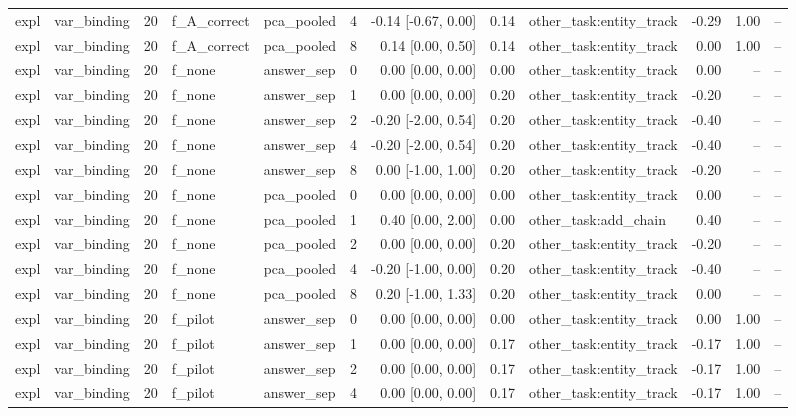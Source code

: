 \begin{tabular}{llrllrrrlrrr}
expl & var\_binding & 20 & f\_A\_correct & pca\_pooled & 4 & -0.14 [-0.67, 0.00] & 0.14 & other\_task:entity\_track & -0.29 & 1.00 & -- \\
expl & var\_binding & 20 & f\_A\_correct & pca\_pooled & 8 & 0.14 [0.00, 0.50] & 0.14 & other\_task:entity\_track & 0.00 & 1.00 & -- \\
expl & var\_binding & 20 & f\_none & answer\_sep & 0 & 0.00 [0.00, 0.00] & 0.00 & other\_task:entity\_track & 0.00 & -- & -- \\
expl & var\_binding & 20 & f\_none & answer\_sep & 1 & 0.00 [0.00, 0.00] & 0.20 & other\_task:entity\_track & -0.20 & -- & -- \\
expl & var\_binding & 20 & f\_none & answer\_sep & 2 & -0.20 [-2.00, 0.54] & 0.20 & other\_task:entity\_track & -0.40 & -- & -- \\
expl & var\_binding & 20 & f\_none & answer\_sep & 4 & -0.20 [-2.00, 0.54] & 0.20 & other\_task:entity\_track & -0.40 & -- & -- \\
expl & var\_binding & 20 & f\_none & answer\_sep & 8 & 0.00 [-1.00, 1.00] & 0.20 & other\_task:entity\_track & -0.20 & -- & -- \\
expl & var\_binding & 20 & f\_none & pca\_pooled & 0 & 0.00 [0.00, 0.00] & 0.00 & other\_task:entity\_track & 0.00 & -- & -- \\
expl & var\_binding & 20 & f\_none & pca\_pooled & 1 & 0.40 [0.00, 2.00] & 0.00 & other\_task:add\_chain & 0.40 & -- & -- \\
expl & var\_binding & 20 & f\_none & pca\_pooled & 2 & 0.00 [0.00, 0.00] & 0.20 & other\_task:entity\_track & -0.20 & -- & -- \\
expl & var\_binding & 20 & f\_none & pca\_pooled & 4 & -0.20 [-1.00, 0.00] & 0.20 & other\_task:entity\_track & -0.40 & -- & -- \\
expl & var\_binding & 20 & f\_none & pca\_pooled & 8 & 0.20 [-1.00, 1.33] & 0.20 & other\_task:entity\_track & 0.00 & -- & -- \\
expl & var\_binding & 20 & f\_pilot & answer\_sep & 0 & 0.00 [0.00, 0.00] & 0.00 & other\_task:entity\_track & 0.00 & 1.00 & -- \\
expl & var\_binding & 20 & f\_pilot & answer\_sep & 1 & 0.00 [0.00, 0.00] & 0.17 & other\_task:entity\_track & -0.17 & 1.00 & -- \\
expl & var\_binding & 20 & f\_pilot & answer\_sep & 2 & 0.00 [0.00, 0.00] & 0.17 & other\_task:entity\_track & -0.17 & 1.00 & -- \\
expl & var\_binding & 20 & f\_pilot & answer\_sep & 4 & 0.00 [0.00, 0.00] & 0.17 & other\_task:entity\_track & -0.17 & 1.00 & -- \\

\end{tabular}
